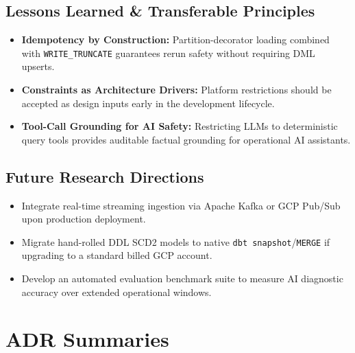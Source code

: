 \documentclass[12pt, a4paper]{report}
\begin{document}
\section{Lessons Learned \& Transferable Principles}
\begin{itemize}
    \item \textbf{Idempotency by Construction:} Partition-decorator loading combined with \texttt{WRITE\_TRUNCATE} guarantees rerun safety without requiring DML upserts.
    \item \textbf{Constraints as Architecture Drivers:} Platform restrictions should be accepted as design inputs early in the development lifecycle.
    \item \textbf{Tool-Call Grounding for AI Safety:} Restricting LLMs to deterministic query tools provides auditable factual grounding for operational AI assistants.
\end{itemize}

\section{Future Research Directions}
\label{sec:future-work}
\begin{itemize}
    \item Integrate real-time streaming ingestion via Apache Kafka or GCP Pub/Sub upon production deployment.
    \item Migrate hand-rolled DDL SCD2 models to native \texttt{dbt snapshot}/\texttt{MERGE} if upgrading to a standard billed GCP account.
    \item Develop an automated evaluation benchmark suite to measure AI diagnostic accuracy over extended operational windows.
\end{itemize}



\appendix

\chapter{ADR Summaries}
\label{app:adrs}
\end{document}
